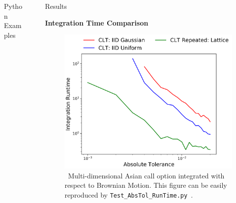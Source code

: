 \documentclass[final]{beamer}
\newcommand{\bfCenter}[1]{\centerline{\textbf{#1}}}
\newlength{\sepwid}
\newlength{\onecolwid}
\newlength{\threecolwid}
\begin{document}
\begin{frame}[t]
\begin{columns}[t]
\begin{column}{\threecolwid}
\begin{column}{\threecolwid}
\begin{block}{Python Examples}
\end{block}
\end{column}

\end{column}

\begin{column}{\sepwid}\end{column}
\begin{column}{\onecolwid}\vspace{-.3in}
\begin{block}{Results}
    \bfCenter{Integration Time Comparison}
    \vspace{-.7in}
    \begin{figure}
        \includegraphics[width=1.05\textwidth]{Images/AbsTol_Runtime_LinePlot.png}
        \vspace{-1ex}
        \caption{\ Multi-dimensional Asian call option integrated with respect to Brownian Motion. This figure can be easily reproduced by \texttt{Test\_AbsTol\_RunTime.py}~\cite{HicEtal19}.}
    \end{figure}
\end{block}


\end{column}
\end{columns}
\end{frame}
\end{document}
